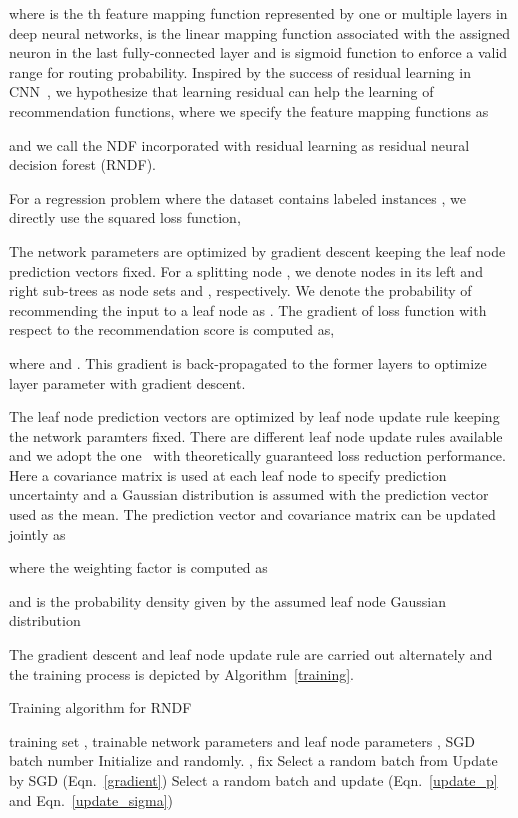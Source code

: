 \documentclass{bmvc2k}
\begin{document}
where  is the th feature mapping function represented by one or multiple layers in deep neural networks,  is the linear mapping function associated with the assigned neuron in the last fully-connected layer and  is sigmoid function to enforce a valid range for routing probability. Inspired by the success of residual learning in CNN~\cite{resnet}, we hypothesize that learning residual can help the learning of recommendation functions, where we specify the feature mapping functions as

and we call the NDF incorporated with residual learning as residual neural decision forest (RNDF).
 
For a regression problem where the dataset contains  labeled instances , we directly use the squared loss function, 



The network parameters are optimized by gradient descent keeping the leaf node prediction vectors fixed. For a splitting node , we denote nodes in its left and right sub-trees as node sets  and , respectively. We denote the probability of recommending the input  to a leaf node  as . The gradient of loss function with respect to the recommendation score 
  is computed as,

where  and . This gradient is back-propagated to the former layers to optimize layer parameter with gradient descent.

The leaf node prediction vectors are optimized by leaf node update rule keeping the network paramters fixed. There are different leaf node update rules available~\cite{Depth, DRFs} and we adopt the one~\cite{DRFs} with theoretically guaranteed loss reduction performance. Here a covariance matrix  is used at each leaf node to specify prediction uncertainty and a Gaussian distribution is assumed with the prediction vector used as the mean. The prediction vector and covariance matrix can be updated jointly as


where the weighting factor  is computed as 

and  is the probability density given by the assumed leaf node Gaussian distribution
 
The gradient descent and leaf node update rule are carried out alternately and the training process is depicted by Algorithm~\ref{training}.

\begin{algorithm}
	\caption{Training algorithm for RNDF}
	\label{alg1}
	\begin{multicols}{2}
		\begin{algorithmic}[1]
			\REQUIRE
			training set , trainable network parameters  and leaf node parameters , SGD batch number 
			\STATE Initialize   and   randomly. 
			\STATE , fix 
			\WHILE {}
			\STATE Select a random batch from  
			\STATE Update  by SGD (Eqn.~\ref{gradient})
			\STATE 
			\ENDWHILE
			\STATE Select a random batch and update  (Eqn.~\ref{update_p} and Eqn.~\ref{update_sigma})
			\ENDWHILE
		\end{algorithmic}
	\end{multicols}
	\label{training}
\end{algorithm}
\end{document}
